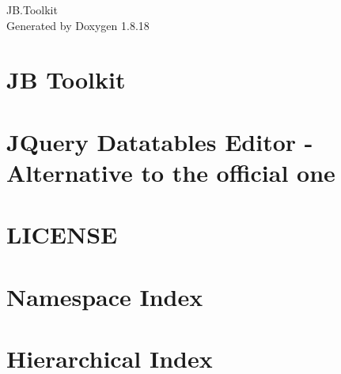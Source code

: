 \let\mypdfximage\pdfximage\def\pdfximage{\immediate\mypdfximage}\documentclass[twoside]{book}
\newcommand{\+}{\discretionary{\mbox{\scriptsize$\hookleftarrow$}}{}{}}
\newcommand{\clearemptydoublepage}{%
  \newpage{\pagestyle{empty}\cleardoublepage}%
}
\begin{document}
\hypersetup{pageanchor=false,
             bookmarksnumbered=true,
             pdfencoding=unicode
            }
\begin{titlepage}
\vspace*{7cm}
\begin{center}%
{\Large J\+B.\+Toolkit }\\
\vspace*{1cm}
{\large Generated by Doxygen 1.8.18}\\
\end{center}
\end{titlepage}
\clearemptydoublepage
{}
\tableofcontents
\clearemptydoublepage
{}
\hypersetup{pageanchor=true}

\chapter{JB Toolkit}
\label{index}\hypertarget{index}{}
\chapter{J\+Query Datatables Editor -\/ Alternative to the official one}
\label{md__d_1__one_drive__documents__work__repositories__j_b_8_toolkit__j_b_8_toolkit__scripts_package8968dd917b05679ae1fd4af33ec29a85}

\chapter{L\+I\+C\+E\+N\+SE}
\label{md__d_1__one_drive__documents__work__repositories__j_b_8_toolkit__j_b_8_toolkit__xml_doc__conver8223f958c48797a0ecc6a78abb04de14}

\chapter{Namespace Index}

\chapter{Hierarchical Index}

\end{document}
